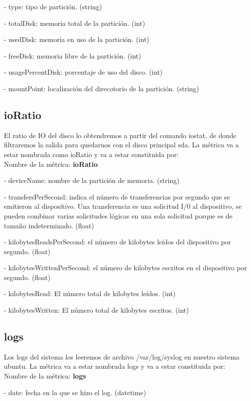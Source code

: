 \documentclass[ spanish, a4paper, 12pt, oneside]{report}
\begin{document}
\hyp{} type: tipo de partición. (string)
  
\hyp{} totalDisk: memoria total de la partición. (int)
  
\hyp{} usedDisk: memoria en uso de la partición. (int)
  
\hyp{} freeDisk: memoria libre de la partición. (int)
  
\hyp{} usagePercentDisk: porcentaje de uso del disco. (int)
   
\hyp{} mountPoint: localización del direcotorio de la partición. (string)

\subsection{ioRatio}
El ratio de IO del disco lo obtendremos a partir del comando iostat, de donde filtraremos la salida para quedarnos con el disco principal sda.
La métrica va a estar nombrada como ioRatio y va a estar constituida por:\\
 
Nombre de la métrica: \textbf{ioRatio}

\hyp{} deviceName: nombre de la partición de memoria. (string)

\hyp{} transfersPerSecond: indica el número de transferencias por segundo que se emitieron al dispositivo. 
Una transferencia es una solicitud I/0 al dispositivo, se pueden combinar varias solicitudes lógicas en una sola solicitud 
porque es de tamaño indeterminado. (float)

\hyp{} kilobytesReadsPerSecond: el número de kilobytes leídos del dispositivo por segundo. (float)

\hyp{} kilobytesWrittenPerSecond: el número de kilobytes escritos en el dispositivo por segundo. (float)

\hyp{} kilobytesRead: El número total de kilobytes leídos. (int)

\hyp{} kilobytesWritten: El número total de kilobytes escritos. (int)

\subsection{logs}
Los logs del sistema los leeremos de archivo /var/log/syslog en nuestro sistema ubuntu.
La métrica va a estar nombrada logs y va a estar constituida por:\\

Nombre de la métrica: \textbf{logs}

\hyp{} date: fecha en la que se hizo el log. (datetime)
\end{document}
